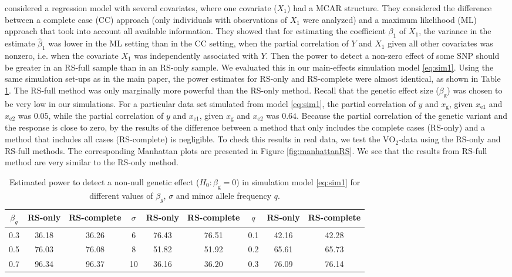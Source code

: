 \documentclass[10pt,a4paper]{article}
\begin{document}
\citet{white2010bias} considered a regression model with several covariates, where one covariate ($X_1$) had a MCAR structure. They considered the difference between a complete case (CC) approach (only individuals with observations of $X_1$ were analyzed) and a maximum likelihood (ML) approach that took into account all available information. They showed that for estimating the coefficient $\beta_1$ of $X_1$, the variance in the estimate $\hat{\beta}_1$ was lower in the ML setting than in the CC setting, when the partial correlation of $Y$ and $X_1$ given all other covariates was nonzero, i.e. when the covariate $X_1$ was independently associated with $Y$. Then the power to detect a non-zero effect of some SNP should be greater in an RS-full sample than in an RS-only sample. We evaluated this in our main-effects simulation model \eqref{eq:sim1}. Using the same simulation set-ups as in the main paper, the power estimates for RS-only and RS-complete were almost identical, as shown in Table \ref{tab:simRS}. The RS-full method was only marginally more powerful than the RS-only method. Recall that the genetic effect size ($\beta_{\text{g}}$) was chosen to be very low in our simulations. For a particular data set simulated from model \eqref{eq:sim1}, the partial correlation of $y$ and $x_{\text{g}}$, given $x_{\text{e}1}$ and $x_{\text{e}2}$ was $0.05$, while the partial correlation of $y$ and $x_{\text{e}1}$, given $x_{\text{g}}$ and $x_{\text{e}2}$ was $0.64$. Because the partial correlation of the genetic variant and the response is close to zero, by the results of \citet{white2010bias} the difference between a method that only includes the complete cases (RS-only) and a method that includes all cases (RS-complete) is negligible. To check this results in real data, we test the $\text{VO}_2$-data using the RS-only and RS-full methods. The corresponding Manhattan plots are presented in Figure \ref{fig:manhattanRS}. We see that the results from RS-full method are very similar to the RS-only method.

\begin{table}
\centering
	\begin{tabular}{c|cc|c|cc|c|cc}
	\hline
$\beta_g$ & RS-only & RS-complete & $\sigma$ & RS-only & RS-complete & $q$ & RS-only & RS-complete \\
	\hline
 0.3 &  36.18 & 36.26  & 6&  76.43& 76.51 & 0.1&  42.16& 42.28 \\
 0.5 &  76.03 & 76.08  & 8&  51.82& 51.92 & 0.2&  65.61& 65.73 \\
 0.7 &  96.34 & 96.37  & 10&  36.16& 36.20& 0.3&  76.09& 76.14 \\
	\hline
	\end{tabular}
	\caption{Estimated power to detect a non-null genetic effect ($H_0: \beta_{\text{g}} = 0$) in simulation model \eqref{eq:sim1} for different values of $\beta_g$, $\sigma$ and minor allele frequency $q$.}
	\label{tab:simRS}
\end{table}
\end{document}
